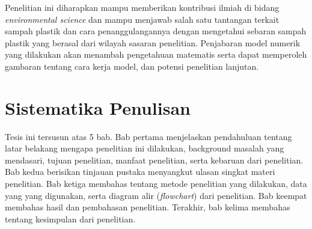\begin{spacing}{1.5}
	Penelitian ini diharapkan mampu memberikan kontribusi ilmiah di bidang \textit{environmental science} dan mampu menjawab salah satu tantangan terkait sampah plastik dan cara penanggulangannya dengan mengetahui sebaran sampah plastik yang berasal dari wilayah sasaran penelitian. Penjabaran model numerik yang dilakukan akan menambah pengetahuan matematis serta dapat memperoleh gambaran tentang cara kerja model, dan potensi penelitian lanjutan.

	\section[Sistematika Penulisan]{Sistematika Penulisan}

	Tesis ini tersusun atas 5 bab. Bab pertama menjelaskan pendahuluan tentang latar belakang mengapa penelitian ini dilakukan, background masalah yang mendasari, tujuan penelitian, manfaat penelitian, serta kebaruan dari penelitian. Bab kedua berisikan tinjauan pustaka menyangkut ulasan singkat materi penelitian. Bab ketiga membahas tentang metode penelitian yang dilakukan, data yang yang digunakan, serta diagram alir (\textit{flowchart}) dari penelitian. Bab keempat membahas hasil dan pembahasan penelitian. Terakhir, bab kelima membahas tentang kesimpulan dari penelitian.
	
\end{spacing}